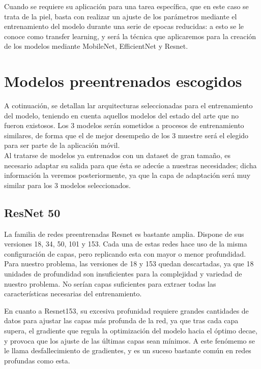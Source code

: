 Cuando se requiere su aplicación para una tarea específica, que en este caso se trata de la piel, basta con realizar un ajuste de los parámetros mediante el entrenamiento del modelo durante una serie de epocas reducidas: a esto se le conoce como transfer learning, y será la técnica que aplicaremos para la creación de los modelos mediante MobileNet, EfficientNet y Resnet.

\section{Modelos preentrenados escogidos}

A cotinuación, se detallan lar arquitecturas seleccionadas para el entrenamiento del modelo, teniendo en cuenta aquellos modelos del estado del arte que no fueron existosos. Los 3 modelos serán sometidos a procesos de entrenamiento similares, de forma que el de mejor desempeño de los 3 muestre será el elegido para ser parte de la aplicación móvil.\\

Al tratarse de modelos ya entrenados con un dataset de gran tamaño, es necesario adaptar su salida para que ésta se adecúe a nuestras necesidades; dicha información la veremos posteriormente, ya que la capa de adaptación será muy similar para los 3 modelos seleccionados.

\subsection{ResNet 50}

La familia de redes preentrenadas Resnet \cite{he2015deep} es bastante amplia. Dispone de sus versiones 18, 34, 50, 101 y 153. Cada una de estas redes hace uso de la misma configuración de capas, pero replicando esta con mayor o menor profundidad. Para nuestro problema, las versiones de 18 y 153 quedan descartadas, ya que 18 unidades de profundidad son insuficientes para la complejidad y variedad de nuestro problema. No serían capas suficientes para extraer todas las características necesarias del entrenamiento.

En cuanto a Resnet153, su excesiva profunidad requiere grandes cantidades de datos para ajustar las capas más profunda de la red, ya que tras cada capa supera, el gradiente que regula la optimización del modelo hacia el óptimo decae, y provoca que los ajuste de las últimas capas sean mínimos. A este fenómemo se le llama desfallecimiento de gradientes, y es un suceso bastante común en redes profundas como esta.

